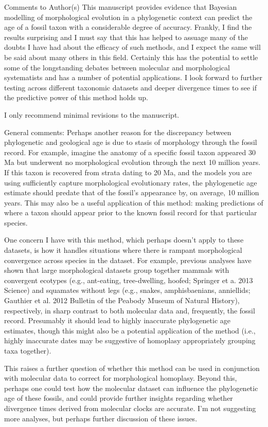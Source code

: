 \documentclass[11pt]{article}
\begin{document}
Comments to Author(s)
This manuscript provides evidence that Bayesian modelling of morphological evolution in a phylogenetic context can predict the age of a fossil taxon with a considerable degree of accuracy. Frankly, I find the results surprising and I must say that this has helped to assuage many of the doubts I have had about the efficacy of such methods, and I expect the same will be said about many others in this field. Certainly this has the potential to settle some of the longstanding debates between molecular and morphological systematists and has a number of potential applications. I look forward to further testing across different taxonomic datasets and deeper divergence times to see if the predictive power of this method holds up. 

I only recommend minimal revisions to the manuscript.

General comments:
Perhaps another reason for the discrepancy between phylogenetic and geological age is due to stasis of morphology through the fossil record. For example, imagine the anatomy of a specific fossil taxon appeared 30 Ma but underwent no morphological evolution through the next 10 million years. If this taxon is recovered from strata dating to 20 Ma, and the models you are using sufficiently capture morphological evolutionary rates, the phylogenetic age estimate should predate that of the fossil's appearance by, on average, 10 million years. This may also be a useful application of this method: making predictions of where a taxon should appear prior to the known fossil record for that particular species.

One concern I have with this method, which perhaps doesn't apply to these datasets, is how it handles situations where there is rampant morphological convergence across species in the dataset. For example, previous analyses have shown that large morphological datasets group together mammals with convergent ecotypes (e.g., ant-eating, tree-dwelling, hoofed; Springer et a. 2013 Science) and squamates without legs (e.g., snakes, amphisbaenians, anniellids; Gauthier et al. 2012 Bulletin of the Peabody Museum of Natural History), respectively, in sharp contrast to both molecular data and, frequently, the fossil record. Presumably it should lead to highly inaccurate phylogenetic age estimates, though this might also be a potential application of the method (i.e., highly inaccurate dates may be suggestive of homoplasy appropriately grouping taxa together).

This raises a further question of whether this method can be used in conjunction with molecular data to correct for morphological homoplasy. Beyond this, perhaps one could test how the molecular dataset can influence the phylogenetic age of these fossils, and could provide further insights regarding whether divergence times derived from molecular clocks are accurate. I'm not suggesting more analyses, but perhaps further discussion of these issues.
\end{document}
